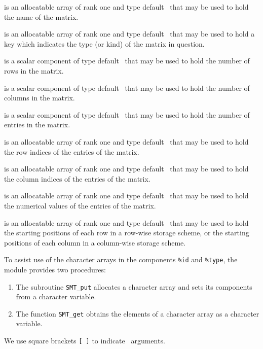 \documentclass{galahad}
\newcommand{\packagename}{SMT}
\begin{document}
\begin{description}
 is an allocatable array of rank one and type default \character\, that
may be used to hold the name of the matrix.

 is an allocatable array of rank one and type default \character\, that
may be used to hold a key which indicates the type (or kind) of the matrix in
question.

 is a scalar component of type default \integer\,
that may be used to hold the number of rows in the matrix.

 is a scalar component of type default \integer\,
that may be used to hold the number of columns in the matrix.

 is a scalar component of type default \integer\,
that may be used to hold the number of entries in the matrix.

 is an allocatable array of rank one and
type default \integer\, that may be used to hold
the row indices of the entries of the matrix.

 is an allocatable array of rank one and
type default \integer\, that may be used to hold
the column indices of the entries of the matrix.

 is an allocatable array of rank one and
type default \realdp\, that may be used to hold
the numerical values of the entries of the matrix.

 is an allocatable array of rank one and
type default \integer\, that may be used to hold
the starting positions of each row in a row-wise storage scheme,
or the starting positions of each column in a column-wise storage
scheme.
\end{description}


\galarguments

To assist use of the character arrays in the components {\tt \%id} and
{\tt \%type}, the module provides two procedures:

\begin{enumerate}
\item The subroutine {\tt \packagename\_put}
allocates a character array and sets
its components from a character variable.

\item The function {\tt \packagename\_get}
obtains the elements of a character array as a character variable.
\end{enumerate}
We use square brackets {\tt [ ]} to indicate \optional\ arguments.
\end{document}
